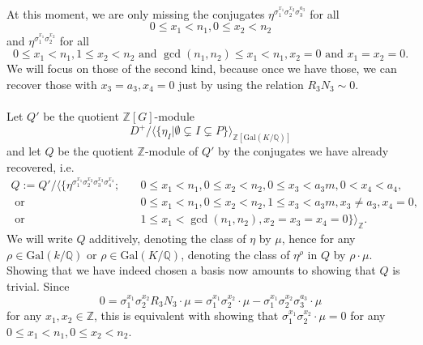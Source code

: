 \documentclass[12pt,a4paper]{article}
\theoremstyle{definition}
\newcommand{\Q}{\mathbb{Q}}
\newcommand{\Z}{\mathbb{Z}}
\newcommand{\Gal}{\mathrm{Gal}}
\begin{document}
\paragraph*{}
At this moment, we are only missing the conjugates $\eta^{\sigma_1^{x_1}\sigma_2^{x_2}\sigma_3^{a_3}}$ for all $$0\leq x_1<n_1, 0\leq x_2<n_2$$ and $\eta^{\sigma_1^{x_1}\sigma_2^{x_2}}$ for all $$0\leq x_1<n_1, 1\leq x_2<n_2 \text{ and } \gcd(n_1,n_2)\leq x_1<n_1,x_2=0 \text{ and } x_1=x_2=0.$$
We will focus on those of the second kind, because once we have those, we can recover those with $x_3=a_3,x_4=0$ just by using the relation $R_3N_3\sim 0$.

\paragraph*{}
Let $Q'$ be the quotient $\Z[G]$-module $$D^+/\big\langle \{\eta_I \big\vert \emptyset \subsetneq I \subsetneq P \}\big\rangle_{\Z[\Gal(K/\Q)]}$$
and let $Q$ be the quotient $\Z$-module of $Q'$ by the conjugates we have already recovered, i.e.
\begin{align*}
Q:=Q'/\big\langle \{\eta^{\sigma_1^{x_1}\sigma_2^{x_2}\sigma_3^{x_3}\sigma_4^{x_4}}; \quad & 0\leq x_1< n_1, 0\leq x_2<n_2, 0\leq x_3<a_3m,0< x_4<a_4,\\
\text { or }& 0\leq x_1< n_1, 0\leq x_2<n_2, 1\leq x_3<a_3m, x_3\neq a_3, x_4=0,\\
\text { or }& 1\leq x_1<\gcd(n_1,n_2), x_2=x_3=x_4=0 \}\big\rangle_{\Z}.
\end{align*}
We will write $Q$ additively, denoting the class of $\eta$ by $\mu$, hence for any $\rho\in\Gal(k/\Q)$ or $\rho\in\Gal(K/\Q)$, denoting the class of $\eta^{\rho}$ in $Q$ by $\rho\cdot \mu$.
Showing that we have indeed chosen a basis now amounts to showing that $Q$ is trivial. Since $$0=\sigma_1^{x_1}\sigma_2^{x_2}R_3N_3\cdot \mu=\sigma_1^{x_1}\sigma_2^{x_2}\cdot \mu-\sigma_1^{x_1}\sigma_2^{x_2}\sigma_3^{a_3}\cdot \mu$$
for any $x_1,x_2\in\Z$,
this is equivalent with showing that $\sigma_1^{x_1}\sigma_2^{x_2}\cdot \mu=0$ for any $0\leq x_1<n_1, 0\leq x_2<n_2$.
\end{document}
